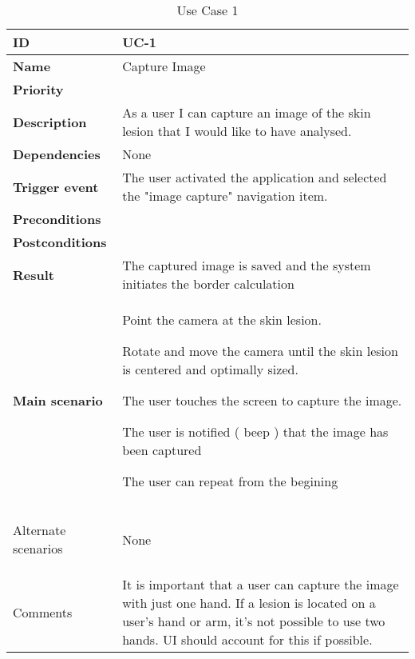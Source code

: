 \begin{table}[H]
    \begin{tabular}[t]{ | >{\bfseries}l | p{9.5cm} |} \hline

    ID &
        UC-1 \\ \hline
    Name &
        Capture Image \\ \hline
    Priority &
        \\ \hline
    Description &
        As a user I can capture an image of the skin lesion that I would like to have analysed. \\ \hline
    Dependencies &
        None \\ \hline
    Trigger event &
        The user activated the application and selected the "image capture" navigation item. \\ \hline
    Preconditions &
         \\ \hline
    Postconditions &
        \\ \hline
    Result &
        The captured image is saved and the system initiates the border calculation\\ \hline
    Main scenario
    &

    \begin{description}[topsep=0cm,align=left]
        \item [1.]Point the camera at the skin lesion.
        \item [2.]Rotate and move the camera until the skin lesion is centered and optimally sized.
        \item [3.]The user touches the screen to capture the image.
        \item [4.]The user is notified ( beep ) that the image has been captured
        \item [5.]The user can repeat from the begining
    \end{description}

    \\ \hline

    Alternate scenarios &
        None \\ \hline

    Comments &
        It is important that a user can capture the image with just one hand. If a lesion is located on a user's hand or arm, it's not possible to use two hands. UI should account for this if possible. \\ \hline

    \end{tabular}
  \caption{Use Case 1}
  \label{fig:uc_1}
\end{table}